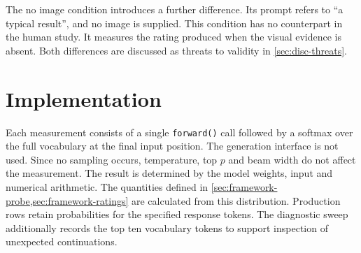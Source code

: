 The no image condition introduces a further difference. Its prompt refers to
``a typical result'', and no image is supplied. This condition has no
counterpart in the human study. It measures the rating produced when the
visual evidence is absent. Both differences are discussed as threats to
validity in \cref{sec:disc-threats}.

\section{Implementation}\label{sec:design-impl}

Each measurement consists of a single \texttt{forward()} call followed by a
softmax over the full vocabulary at the final input position. The generation
interface is not used. Since no sampling occurs, temperature, top $p$ and beam
width do not affect the measurement. The result is determined by the model
weights, input and numerical arithmetic. The quantities defined in
\cref{sec:framework-probe,sec:framework-ratings} are calculated from this
distribution. Production rows retain probabilities for the specified response tokens.
The diagnostic sweep additionally records the top ten vocabulary tokens to
support inspection of unexpected continuations.

